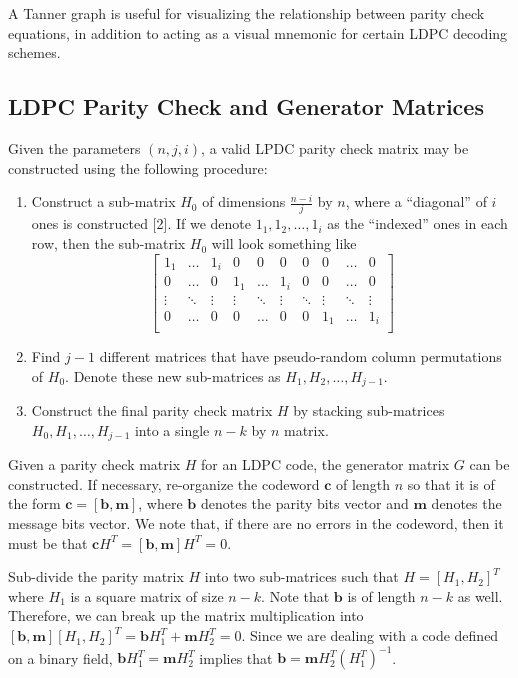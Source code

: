 \documentclass[conference]{IEEEtran}
\begin{document}
A Tanner graph is useful for visualizing the relationship between parity check equations, in addition to acting as a visual mnemonic for certain LDPC decoding schemes.

\subsection{LDPC Parity Check and Generator Matrices}
Given the parameters $(n,j,i)$, a valid LPDC parity check matrix may be constructed using the following procedure:
\begin{enumerate}
  \item Construct a sub-matrix $H_0$ of dimensions $\frac{n-i}{j}$ by $n$, where a ``diagonal'' of $i$ ones is constructed [2].
    If we denote $1_1, 1_2, \ldots, 1_i$ as the ``indexed'' ones in each row, then the sub-matrix $H_0$ will look something like
    $$\begin{bmatrix}
      1_1   &\ldots& 1_i  & 0    & 0    & 0    & 0    &0     &\ldots& 0\\
      0     &\ldots& 0    & 1_1  &\ldots& 1_i  & 0    &0     &\ldots& 0\\
      \vdots&\ddots&\vdots&\vdots&\ddots&\vdots&\ddots&\vdots&\ddots&\vdots \\
      0     &\ldots& 0    & 0    &\ldots& 0    & 0    & 1_1  &\ldots& 1_i \\
    \end{bmatrix}$$
  \item Find $j - 1$ different matrices that have pseudo-random column permutations of $H_0$. Denote these new sub-matrices as $H_1, H_2, \ldots, H_{j-1}$.
  \item Construct the final parity check matrix $H$ by stacking sub-matrices $H_0,H_1,\ldots,H_{j-1}$ into a single $n-k$ by $n$ matrix.
\end{enumerate}

Given a parity check matrix $H$ for an LDPC code, the generator matrix $G$ can
be constructed.
If necessary, re-organize the codeword $\textbf{c}$ of length $n$ so that it is of the form $\textbf{c} = [\textbf{b}, \textbf{m}]$, where $\textbf{b}$ denotes the parity bits vector and $\textbf{m}$ denotes the message bits vector.
    We note that, if there are no errors in the codeword, then it must be that $\textbf{c}H^T = [\textbf{b}, \textbf{m}]H^T = 0$.

Sub-divide the parity matrix $H$ into two sub-matrices such that $H = [H_1, H_2]^T$ where $H_1$ is a square matrix of size $n-k$.
    Note that $\textbf{b}$ is of length $n-k$ as well.
    Therefore, we can break up the matrix
    multiplication into $[\textbf{b}, \textbf{m}][H_1, H_2]^T = \textbf{b}H_1^T + \textbf{m}H_2^T = 0$.
Since we are dealing with a code defined on a binary field, $\textbf{b}H_1^T = \textbf{m}H_2^T$ implies that $\textbf{b}= \textbf{m}H_2^T(H_1^T)^{-1}$.
\end{document}
